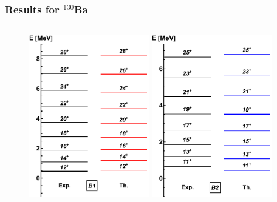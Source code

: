 \documentclass{beamer}
\begin{document}
\begin{frame}
	\frametitle{Results for $^{130}$Ba}
	\begin{columns}
		\begin{column}{0.6\textwidth}
			\begin{figure}
				\centering
				\includegraphics[width=0.49\textwidth]{figures/ba130-band1.pdf}
				\includegraphics[width=0.49\textwidth]{figures/ba130-band2.pdf}
			\end{figure}				
		\end{column}
		\begin{column}{0.4\textwidth}
			\begin{table}
				\centering
\end{table}
\end{column}
\end{columns}
\end{frame}
\end{document}
